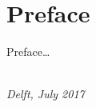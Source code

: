 \chapter*{Preface}

Preface\ldots

\begin{flushright}
{\makeatletter\itshape
    \@author \\
    Delft, July 2017
\makeatother}
\end{flushright}
